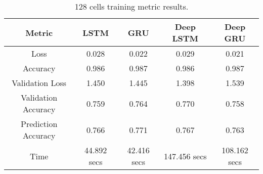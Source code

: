 \documentclass[a4paper,10pt]{article}
\begin{document}
	

	
	\begin{table}[t]
		\centering
		\small
		\begin{tabular}[t]{ | c | c | c | c | c | }
			\hline
			Metric          & LSTM      & GRU   & Deep LSTM & Deep GRU \\ 
			\hline
			Loss            & 0.028     & 0.022 & 0.029     & 0.021 \\ 
			\hline
			Accuracy        & 0.986     & 0.987 & 0.986     & 0.987  \\ 
			\hline
			Validation Loss & 1.450     & 1.445 & 1.398     & 1.539 \\
			\hline
			Validation Accuracy & 0.759 & 0.764 & 0.770     & 0.758 \\
			\hline
			Prediction Accuracy & 0.766     & 0.771 & 0.767     & 0.763 \\
			\hline
			Time & 44.892 secs & 42.416 secs & 147.456 secs & 108.162 secs \\
			\hline
		\end{tabular}
		\caption{128 cells training metric results.}
		\label{tab:128_metrics}
	\end{table}%
\end{document}
